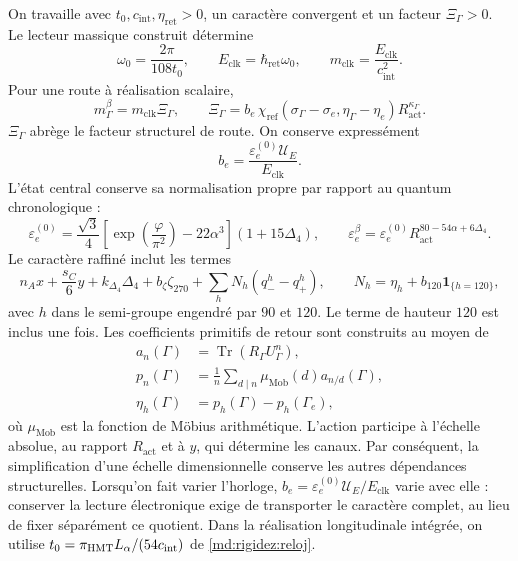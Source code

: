 On travaille avec $t_0,c_{\mathrm{int}},\eta_{\mathrm{ret}}>0$, un caractère
convergent et un facteur $\Xi_\Gamma>0$. Le lecteur massique construit détermine
\begin{equation}
 \omega_0=\frac{2\pi}{108t_0},\qquad
 E_{\mathrm{clk}}=\hbar_{\mathrm{ret}}\omega_0,\qquad
 m_{\mathrm{clk}}=\frac{E_{\mathrm{clk}}}{c_{\mathrm{int}}^2}.
 \label{md:hib:reloj}
\end{equation}
Pour une route à réalisation scalaire,
\begin{equation}
 m_\Gamma^\beta=m_{\mathrm{clk}}\Xi_\Gamma,\qquad
 \Xi_\Gamma=b_e\,
 \chi_{\mathrm{ref}}(\sigma_\Gamma-\sigma_e,\eta_\Gamma-\eta_e)
 R_{\mathrm{act}}^{\kappa_\Gamma}.
 \label{md:hib:factor-ruta}
\end{equation}
$\Xi_\Gamma$ abrège le facteur structurel de route. On conserve expressément
\begin{equation}
 b_e=\frac{\varepsilon_e^{(0)}\mathcal U_E}{E_{\mathrm{clk}}}.
 \label{md:hib:normalizacion-electron}
\end{equation}
L’état central conserve sa normalisation propre par rapport au quantum
chronologique :
\begin{equation}
 \varepsilon_e^{(0)}=\frac{\sqrt3}{4}
 \left[\exp\!\left(\frac{\varphi}{\pi^2}\right)-22\alpha^3\right]
 (1+15\Delta_4),\qquad
 \varepsilon_e^\beta=\varepsilon_e^{(0)}
 R_{\mathrm{act}}^{80-54\alpha+6\Delta_4}.
 \label{md:hib:electron}
\end{equation}
Le caractère raffiné inclut les termes
\begin{equation}
 n_Ax+\frac{s_C}{6}y+k_{\Delta_4}\Delta_4+b_\zeta\zeta_{270}
 +\sum_h N_h(q_-^h-q_+^h),\qquad
 N_h=\eta_h+b_{120}\mathbf 1_{\{h=120\}},
 \label{md:hib:caracter}
\end{equation}
avec $h$ dans le semi-groupe engendré par $90$ et $120$. Le terme de hauteur
$120$ est inclus une fois. Les coefficients primitifs de retour sont
construits au moyen de
\begin{equation}
 \begin{aligned}
 a_n(\Gamma)&=\operatorname{Tr}(R_\Gamma U_\Gamma^n),\\
 p_n(\Gamma)&=\frac1n\sum_{d\mid n}\mu_{\mathrm{Mob}}(d)
                         a_{n/d}(\Gamma),\\
 \eta_h(\Gamma)&=p_h(\Gamma)-p_h(\Gamma_e),
 \end{aligned}
 \label{md:hib:retornos-primitivos}
\end{equation}
où $\mu_{\mathrm{Mob}}$ est la fonction de Möbius arithmétique.
L’action participe à l’échelle absolue, au rapport $R_{\mathrm{act}}$
et à $y$, qui détermine les canaux. Par conséquent, la simplification d’une
échelle dimensionnelle conserve les autres dépendances structurelles.
Lorsqu’on fait varier l’horloge, $b_e=\varepsilon_e^{(0)}\mathcal U_E/E_{\mathrm{clk}}$
varie avec elle : conserver la lecture électronique exige de transporter le
caractère complet, au lieu de fixer séparément ce quotient.
Dans la réalisation longitudinale intégrée, on utilise
$t_0=\pi_{\rm HMT}L_\alpha/(54c_{\mathrm{int}})$ de
\eqref{md:rigidez:reloj}.

